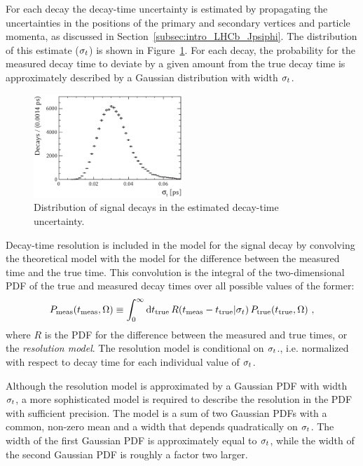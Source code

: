 For each decay the decay-time uncertainty is estimated by propagating the uncertainties in the positions of the primary and secondary
vertices and particle momenta, as discussed in Section~\ref{subsec:intro_LHCb_Jpsiphi}. The distribution of this estimate ($\sigma_t$) is
shown in Figure~\ref{fig:sigmat}. For each decay, the probability for the measured decay time to deviate by a given amount from the true
decay time is approximately described by a Gaussian distribution with width $\sigma_t$.
\begin{figure}[htbp]
  \centering
  \includegraphics[width=0.5\textwidth]{graphics/analysis/sigmat}
  \caption{Distribution of \BstoJpsiKK{} signal decays in the estimated decay-time uncertainty.}
  \label{fig:sigmat}
\end{figure}

Decay-time resolution is included in the model for the signal decay by convolving the theoretical model with the model for the difference
between the measured time and the true time. This convolution is the integral of the two-dimensional PDF of the true and measured decay
times over all possible values of the former:
\begin{equation}
  P_\text{meas}(t_\text{meas}, \Omega)
    \equiv \int_0^\infty \ud t_\text{true}\, R(t_\text{meas} - t_\text{true}|\sigmat)\, P_\text{true}(t_\text{true}, \Omega)\ ,
\end{equation}
where $R$ is the PDF for the difference between the measured and true times, or the \emph{resolution model}. The resolution model is
conditional on $\sigma_t$., i.e. normalized with respect to decay time for each individual value of $\sigma_t$.

Although the resolution model is approximated by a Gaussian PDF with width $\sigma_t$, a more sophisticated model is required to describe
the resolution in the PDF with sufficient precision. The model is a sum of two Gaussian PDFs with a common, non-zero mean and a width that
depends quadratically on $\sigma_t$. The width of the first Gaussian PDF is approximately equal to $\sigma_t$, while the width of the second
Gaussian PDF is roughly a factor two larger.

